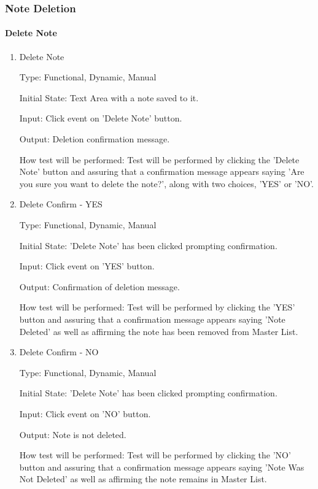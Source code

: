 \documentclass[12pt, titlepage]{article}
\begin{document}
\subsubsection{Note Deletion}

\paragraph{Delete Note}

\begin{enumerate}
	
	\item{Delete Note\\}
	
	Type: Functional, Dynamic, Manual
	
	Initial State: Text Area with a note saved to it. 
	
	Input: Click event on 'Delete Note' button.
	
	Output: Deletion confirmation message. 
	
	How test will be performed: Test will be performed by clicking the 'Delete Note' button 
	and assuring that a confirmation message appears saying 'Are you sure you want to 
	delete the note?', along with two choices, 'YES' or 'NO'.
	
	\item{Delete Confirm - YES\\}
	
	Type: Functional, Dynamic, Manual
	
	Initial State: 'Delete Note' has been clicked prompting confirmation. 

	Input: Click event on 'YES' button.
	
	Output: Confirmation of deletion message. 
	
	How test will be performed: Test will be performed by clicking the 'YES' button 
	and assuring that a confirmation message appears saying 'Note Deleted' as well as 
	affirming the note has been removed from Master List. 

	\item{Delete Confirm - NO\\}
	
	Type: Functional, Dynamic, Manual
	
	Initial State: 'Delete Note' has been clicked prompting confirmation. 
	
	Input: Click event on 'NO' button.
	
	Output: Note is not deleted. 
	
	How test will be performed: Test will be performed by clicking the 'NO' button 
	and assuring that a confirmation message appears saying 'Note Was Not Deleted' as 
	well as affirming the note remains in Master List. 	
	
\end{enumerate}
\end{document}
